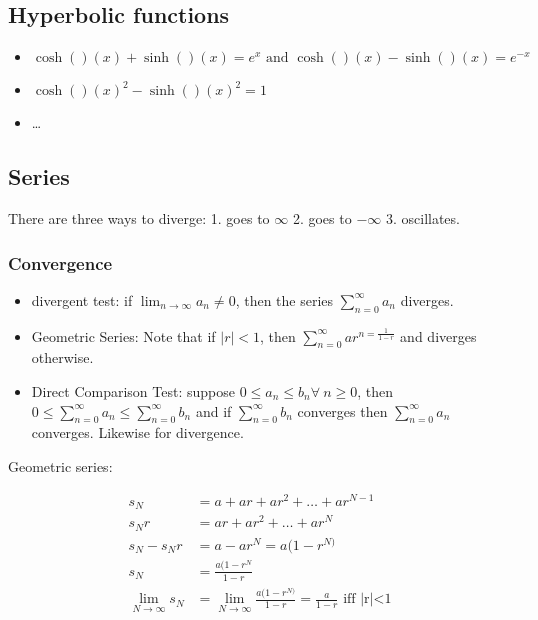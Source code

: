\documentclass[class=article,crop=false]{standalone}
\begin{document}
\subsection{Hyperbolic functions}
\begin{itemize}
	\item $\cosh( )(x )+\sinh( )(x )=e^{x} \text{ and } \cosh( )(x )-\sinh( )(x )=e^{-x} $ 
	\item $\cosh( )(x )^2-\sinh( )(x )^2=1$
	\item \ldots
\end{itemize}

\subsection{Series}
There are three ways to diverge: 1. goes to $\infty$ 2. goes to $-\infty$ 3. oscillates.\\

\subsubsection{Convergence}
\begin{itemize}
	\item divergent test: if $\lim_{ n \to \infty} a_n \neq 0$, then the series $\sum_{ n=0}^{\infty} a_n$ diverges. 
	\item Geometric Series: Note that if $ |r|<1 $, then  $\sum_{ n=0}^{\infty} a r^{n=\frac{1}{1-r}}$ and diverges otherwise.
	\item Direct Comparison Test: suppose $0 \leq a_n \leq b_n \forall\ n \geq 0$, then $0 \leq \sum_{ n=0}^{\infty} a_n \leq \sum_{ n=0}^{\infty} b_n $ and if $\sum_{ n=0}^{\infty} b_n$ converges then $\sum_{ n=0}^{\infty} a_n$ converges. Likewise for divergence.
\end{itemize}
Geometric series:
\begin{prf}
\begin{align*}
	s_N &= a + ar+ ar^2 + \ldots + ar^{N-1} \\
	s_N r &= ar + ar^2+\ldots+ ar^{N} \\
	s_N - s_N r &= a - ar^{N} = a(1-r^{N)}\\
	s_N &= \frac{a(1-r^{N}}{1-r} \\
	\lim_{ N \to \infty} s_N &= \lim_{ N \to \infty} \frac{a(1-r^{N)}}{1-r} = \frac{a}{1-r} \text{ iff |r|<1} 
\end{align*}
\end{prf}
\end{document}
